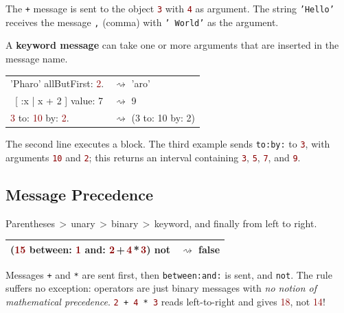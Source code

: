 \documentclass[notumble]{leaflet}
\newcommand{\code}[1]{\foreignlanguage{english}{\texttt{#1}}}
\begin{document}
The \code{+} message is sent to the object
\textcolor{darkRed}{\code{3}} with \textcolor{darkRed}{\code{4}} as
 argument. The string \textcolor{string}{\code{'Hello'}} receives the message \code{,}
(comma) with \textcolor{string}{\code{'~World'}} as the argument.

A \textbf{keyword message} can take one or more
arguments that are inserted in the message name.

\noindent
\begin{tabularx}{\linewidth}{@{}lX@{}}
        \toprule
     \textcolor{string}{'Pharo'} allButFirst: \textcolor{darkRed}{2}.& $\rightsquigarrow$ 'aro' \\
\ [ :x | x + 2 ] value: 7 & $\rightsquigarrow$ 9 \\
     \textcolor{darkRed}{3} to: \textcolor{darkRed}{10} by: \textcolor{darkRed}{2}.& $\rightsquigarrow$ (3 to: 10 by: 2)\\
       \midrule
\end{tabularx}

The second line executes a block. 
The third example sends
\code{to:by:} to \textcolor{darkRed}{\code{3}}, with arguments
\textcolor{darkRed}{\code{10}} and \textcolor{darkRed}{\code{2}}; this
returns an interval containing \textcolor{darkRed}{\code{3}},
\textcolor{darkRed}{\code{5}}, \textcolor{darkRed}{\code{7}}, and
\textcolor{darkRed}{\code{9}}. 

\vspace{-0.3cm}
\subsection{Message Precedence}

Parentheses\,$>$\,unary\,$>$\,binary\,$>$\,keyword, and finally from
left to right.

\noindent
\begin{tabularx}{\linewidth}{@{}lX@{}}
        \toprule
    (\textcolor{darkRed}{15} between: \textcolor{darkRed}{1} and: \textcolor{darkRed}{2}\,+\,\textcolor{darkRed}{4}\,*\,\textcolor{darkRed}{3}) not& $\rightsquigarrow$ false \\
       \midrule
\end{tabularx}



Messages \code{+} and \code{*} are sent first, then \code{between:and:} is sent, and \code{not}.
The rule suffers no exception: operators are just binary messages with \emph{no notion of mathematical precedence}.
\code{\textcolor{darkRed}{2}\,+\,\textcolor{darkRed}{4}\,*\,\textcolor{darkRed}{3}} reads left-to-right and gives \textcolor{darkRed}{18}, not \textcolor{darkRed}{14}!
\end{document}
